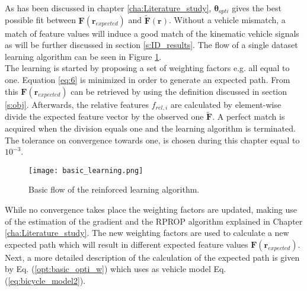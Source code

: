 
As has been discussed in chapter \ref{cha:Literature_study},  $\bm{\theta}_{opti}$ gives the best possible fit between $\bm{F}(\bm{r}_{expected})$ and $\bm{\tilde{F}(\bm{r})}$.
Without a vehicle mismatch, a match of feature values will induce a good match of the kinematic vehicle signals as will be further discussed in section \ref{s:ID_results}.
The flow of a single dataset learning algorithm can be seen in Figure \ref{fig:basic learning}.\\


The learning is started by proposing a set of weighting factors e.g. all equal to one. Equation \ref{eq:6} is minimized in order to generate an expected path. From this $\bm{F}(\bm{r}_{expected})$ can be retrieved by using the definition discussed in section \ref{s:obj}. Afterwards, the relative features $f_{rel,i}$ are calculated by element-wise  divide  the expected feature vector by the observed one $\bm{\tilde{F}}$. A perfect match is acquired when the division equals one and the learning algorithm is terminated. The tolerance on convergence towards one, is chosen during this chapter equal to $10^{-3}$.

\begin{figure}[h!]
	\centering
	\texttt{[image: basic\_learning.png]}
	\caption{Basic flow of the reinforced learning algorithm.}
	\label{fig:basic learning}
\end{figure}

  
While no convergence takes place the weighting factors are updated, making use of the estimation of the gradient and the RPROP algorithm explained in Chapter \ref{cha:Literature_study}. The new weighting factors are used to calculate a new expected path which will result in different expected feature values $\bm{F}(\bm{r}_{expected})$.  Next, a more detailed description of the calculation of the expected path is given by Eq. (\ref{opt:basic_opti_w}) which uses as vehicle model Eq. (\ref{eq:bicycle_model2}). \\

